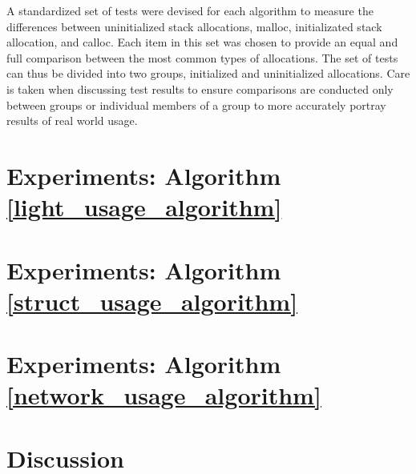 \documentclass[letterpaper, 10 pt, conference]{ieeeconf}  %
\begin{document}
A standardized set of tests were devised for each algorithm to measure the differences between uninitialized stack allocations, malloc, initializated stack allocation, and calloc.
Each item in this set was chosen to provide an equal and full comparison between the most common types of allocations.
The set of tests can thus be divided into two groups, initialized and uninitialized allocations.
Care is taken when discussing test results to ensure comparisons are conducted only between groups or individual members of a group to more accurately portray results of real world usage. 


\section{Experiments: Algorithm \ref{light_usage_algorithm}}

\section{Experiments: Algorithm \ref{struct_usage_algorithm}}

\section{Experiments: Algorithm \ref{network_usage_algorithm}}

\section{Discussion}

\end{document}
